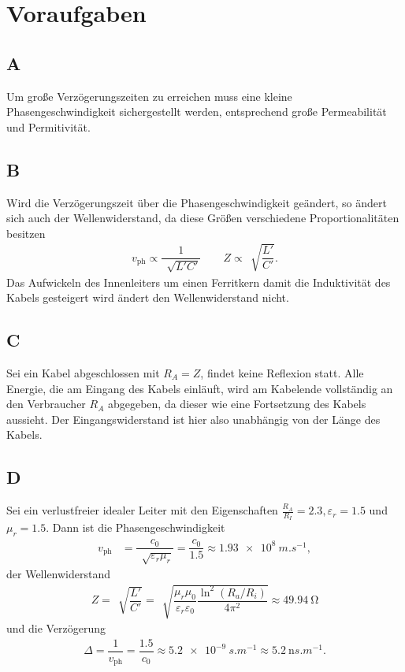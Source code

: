 \documentclass[a4paper,10pt]{article}
\numberwithin{equation}{section}
\begin{document}
\newpage
\section{Voraufgaben}
\subsection{A}
Um große Verzögerungszeiten zu erreichen muss eine kleine Phasengeschwindigkeit sichergestellt werden, entsprechend große Permeabilität und Permitivität.

\subsection{B}
Wird die Verzögerungszeit über die Phasengeschwindigkeit geändert, so ändert sich auch der Wellenwiderstand, da diese Größen verschiedene Proportionalitäten besitzen
\begin{align} 
        v_{\text{ph}}\propto \dfrac{1}{\,\sqrt[]{L'C'}}\qquad Z\propto \,\sqrt[]{\dfrac{L'}{C'}}
.\end{align} 
Das Aufwickeln des Innenleiters um einen Ferritkern damit die Induktivität des Kabels gesteigert wird ändert den Wellenwiderstand nicht.

\subsection{C}
Sei ein Kabel abgeschlossen mit $R_A=Z$, findet keine Reflexion statt.
Alle Energie, die am Eingang des Kabels einläuft, wird am Kabelende vollständig an den Verbraucher $R_A$ abgegeben, da dieser wie eine Fortsetzung des Kabels aussieht.
Der Eingangswiderstand ist hier also unabhängig von der Länge des Kabels.

\subsection{D}
Sei ein verlustfreier idealer Leiter mit den Eigenschaften $\tfrac{R_A}{R_I}=2.3,\varepsilon _r=1.5$ und $\mu _r=1.5$.
Dann ist die Phasengeschwindigkeit
\begin{align} 
        v_{\text{ph}}&=\dfrac{c_0}{\,\sqrt[]{\varepsilon _r\mu _r}}=\dfrac{c_0}{1.5}\approx \SI{1.93e+8}{m.s ^{-1}}
,\end{align} 
der Wellenwiderstand
\begin{align} 
        Z=\,\sqrt[]{\dfrac{L'}{C'}}=\,\sqrt[]{\dfrac{\mu _r\mu _0}{\varepsilon _r\varepsilon _0}\dfrac{\ln^2\left(R_a/R_i\right)}{4\pi ^2}}\approx \SI{49.94}{\ohm}
\end{align} 
und die Verzögerung
\begin{align} 
        \Delta =\dfrac{1}{v_{\text{ph} }}=\dfrac{1.5}{c_0}\approx \SI{5.2e-9}{s.m ^{-1}}\approx \SI{5.2}{\nano s.m ^{-1}}
.\end{align} 
\end{document}
